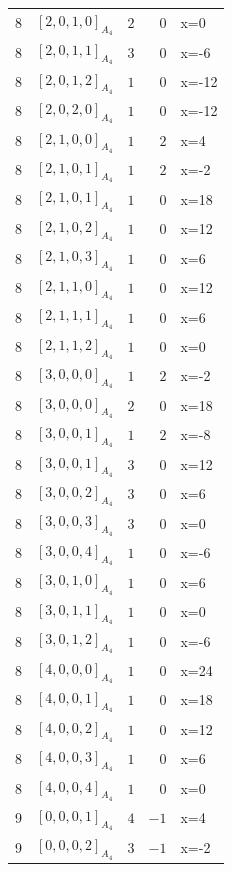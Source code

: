 \documentclass[11pt]{article}
\newcommand{\Dynkin}[1]{#1}
\begin{document}
\begin{longtable}{r l r r l}
8 & $\Dynkin{[2,0,1,0]_{A_4}}$ & $2$ & $0$ & x=0\\
8 & $\Dynkin{[2,0,1,1]_{A_4}}$ & $3$ & $0$ & x=-6\\
8 & $\Dynkin{[2,0,1,2]_{A_4}}$ & $1$ & $0$ & x=-12\\
8 & $\Dynkin{[2,0,2,0]_{A_4}}$ & $1$ & $0$ & x=-12\\
8 & $\Dynkin{[2,1,0,0]_{A_4}}$ & $1$ & $2$ & x=4\\
8 & $\Dynkin{[2,1,0,1]_{A_4}}$ & $1$ & $2$ & x=-2\\
8 & $\Dynkin{[2,1,0,1]_{A_4}}$ & $1$ & $0$ & x=18\\
8 & $\Dynkin{[2,1,0,2]_{A_4}}$ & $1$ & $0$ & x=12\\
8 & $\Dynkin{[2,1,0,3]_{A_4}}$ & $1$ & $0$ & x=6\\
8 & $\Dynkin{[2,1,1,0]_{A_4}}$ & $1$ & $0$ & x=12\\
8 & $\Dynkin{[2,1,1,1]_{A_4}}$ & $1$ & $0$ & x=6\\
8 & $\Dynkin{[2,1,1,2]_{A_4}}$ & $1$ & $0$ & x=0\\
8 & $\Dynkin{[3,0,0,0]_{A_4}}$ & $1$ & $2$ & x=-2\\
8 & $\Dynkin{[3,0,0,0]_{A_4}}$ & $2$ & $0$ & x=18\\
8 & $\Dynkin{[3,0,0,1]_{A_4}}$ & $1$ & $2$ & x=-8\\
8 & $\Dynkin{[3,0,0,1]_{A_4}}$ & $3$ & $0$ & x=12\\
8 & $\Dynkin{[3,0,0,2]_{A_4}}$ & $3$ & $0$ & x=6\\
8 & $\Dynkin{[3,0,0,3]_{A_4}}$ & $3$ & $0$ & x=0\\
8 & $\Dynkin{[3,0,0,4]_{A_4}}$ & $1$ & $0$ & x=-6\\
8 & $\Dynkin{[3,0,1,0]_{A_4}}$ & $1$ & $0$ & x=6\\
8 & $\Dynkin{[3,0,1,1]_{A_4}}$ & $1$ & $0$ & x=0\\
8 & $\Dynkin{[3,0,1,2]_{A_4}}$ & $1$ & $0$ & x=-6\\
8 & $\Dynkin{[4,0,0,0]_{A_4}}$ & $1$ & $0$ & x=24\\
8 & $\Dynkin{[4,0,0,1]_{A_4}}$ & $1$ & $0$ & x=18\\
8 & $\Dynkin{[4,0,0,2]_{A_4}}$ & $1$ & $0$ & x=12\\
8 & $\Dynkin{[4,0,0,3]_{A_4}}$ & $1$ & $0$ & x=6\\
8 & $\Dynkin{[4,0,0,4]_{A_4}}$ & $1$ & $0$ & x=0\\
9 & $\Dynkin{[0,0,0,1]_{A_4}}$ & $4$ & $-1$ & x=4\\
9 & $\Dynkin{[0,0,0,2]_{A_4}}$ & $3$ & $-1$ & x=-2\\

\end{longtable}
\end{document}
